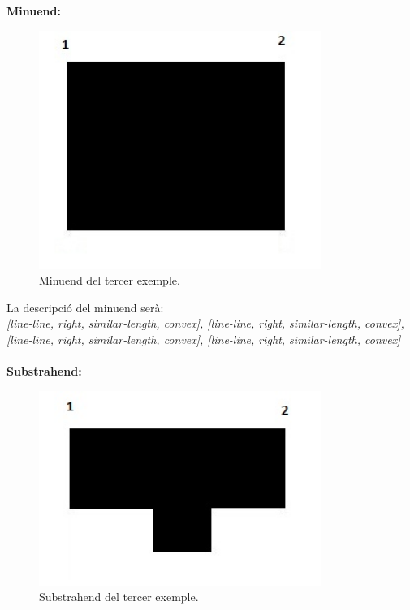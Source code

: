 \documentclass{article}
\begin{document}
{\bf Minuend:}
\begin{figure}[!h]
\centering
\includegraphics[width=260pt]{images/quad_gran.jpg}
\caption {Minuend del tercer exemple.}
\label {fig:quad_gran3}
\end{figure}

La descripció del minuend serà:
\\
\emph {[line-line, right, similar-length, convex], [line-line, right, similar-length, convex], [line-line, right, similar-length, convex], [line-line, right, similar-length, convex]}
\\
\\

{\bf Substrahend:}
\begin{figure}[!h]
\centering
\includegraphics[width=260pt]{images/quad_punta.jpg}
\caption {Substrahend del tercer exemple.}
\label {fig:quad_punta}
\end{figure}
\end{document}
